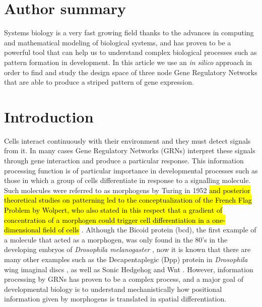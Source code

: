 \documentclass[10pt,letterpaper]{article}
\newcommand{\hil}[1]{\hl{#1}} %
\begin{document}
\section*{Author summary}
Systems biology is a very fast growing field thanks to the advances in computing and
mathematical modeling of biological systems, and has proven to be a powerful tool that
can help us to understand complex biological processes such as pattern formation in
development. In this article we use an \textit{in silico} approach in order to find and study
the design space of three node Gene Regulatory Networks that are able to produce a
striped pattern of gene expression.

\linenumbers

\section*{Introduction}

Cells interact continuously with their environment and they must detect signals
from it. In many cases Gene Regulatory Networks (GRNs) interpret these signals
through gene interaction and produce a particular response. This information
processing function is of particular importance in developmental processes such
as those in which a group of cells differentiate in response to a signalling
molecule. Such molecules were referred to as morphogens by Turing in 1952
\cite{Turing1952} \hil{and posterior theoretical studies on patterning led to the
conceptualization of the French Flag Problem by Wolpert, who also stated
in this respect that a gradient of concentration of a morphogen could
trigger cell differentiation in a one-dimensional field of cells}
\cite{Wolpert1969, sharpe_2019}.
Although the Bicoid protein (bcd), the first example of a molecule that acted
as a morphogen, was only found in the 80's in the developing embryos of
\textit{Drosophila melanogaster}
\cite{driever_gradient_1988, driever_bicoid_1988}, now it is known that there
are many other examples such as the Decapentaplegic (Dpp) protein in
\textit{Drosophila} wing imaginal discs \cite{affolter_decapentaplegic_2007},
as well as Sonic Hedgehog \cite{dessaud_dynamic_2010,cohen_theoretical_2014}
and Wnt \cite{raspopovic_digit_2014}. However, information processing by GRNs
has proven to be a complex process, and a major goal of developmental biology
is to understand mechanistically how positional information given by morphogens
is translated in spatial differentiation.\\
\end{document}
